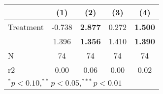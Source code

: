 \begin{tabular}{lcccc}
\hline\hline
                    &         (1)   &         (2)   &         (3)   &         (4)    \\
\hline
Treatment           &     -0.738  &     \textbf{2.877}  &     0.272  &     \textbf{1.500}  \\
                    &     1.396        &     \textbf{1.356}        &     1.410        &     \textbf{1.390}        \\
\hline
N                   &      74        &     74                  &     74         &      74                 \\
r2                  &      0.00       &     0.06                 &     0.00        &      0.02                \\
\hline
\multicolumn{5}{l}{$^{*}p<0.10, ^{**}p<0.05, ^{***}p<0.01$} \\
\end{tabular}
